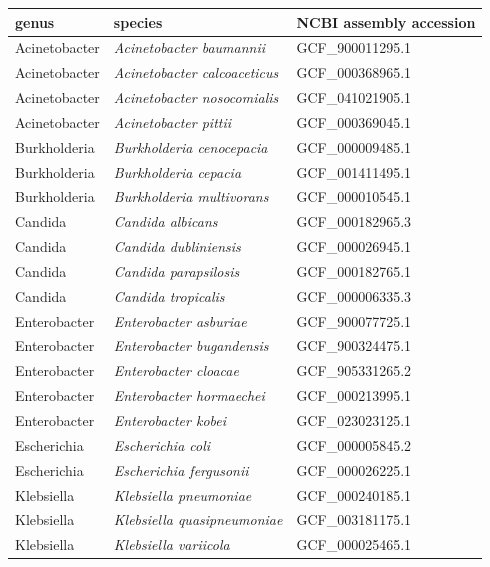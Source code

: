 \begin{tabular}{@{}lll@{}}
\toprule
\textbf{genus} & \textbf{species} & \textbf{NCBI assembly accession} \\
\midrule
Acinetobacter & \textit{Acinetobacter baumannii} & GCF\_900011295.1 \\
Acinetobacter & \textit{Acinetobacter calcoaceticus} & GCF\_000368965.1 \\
Acinetobacter & \textit{Acinetobacter nosocomialis} & GCF\_041021905.1 \\
Acinetobacter & \textit{Acinetobacter pittii} & GCF\_000369045.1 \\
Burkholderia & \textit{Burkholderia cenocepacia} & GCF\_000009485.1 \\
Burkholderia & \textit{Burkholderia cepacia} & GCF\_001411495.1 \\
Burkholderia & \textit{Burkholderia multivorans} & GCF\_000010545.1 \\
Candida & \textit{Candida albicans} & GCF\_000182965.3 \\
Candida & \textit{Candida dubliniensis} & GCF\_000026945.1 \\
Candida & \textit{Candida parapsilosis} & GCF\_000182765.1 \\
Candida & \textit{Candida tropicalis} & GCF\_000006335.3 \\
Enterobacter & \textit{Enterobacter asburiae} & GCF\_900077725.1 \\
Enterobacter & \textit{Enterobacter bugandensis} & GCF\_900324475.1 \\
Enterobacter & \textit{Enterobacter cloacae} & GCF\_905331265.2 \\
Enterobacter & \textit{Enterobacter hormaechei} & GCF\_000213995.1 \\
Enterobacter & \textit{Enterobacter kobei} & GCF\_023023125.1 \\
Escherichia & \textit{Escherichia coli} & GCF\_000005845.2 \\
Escherichia & \textit{Escherichia fergusonii} & GCF\_000026225.1 \\
Klebsiella & \textit{Klebsiella pneumoniae} & GCF\_000240185.1 \\
Klebsiella & \textit{Klebsiella quasipneumoniae} & GCF\_003181175.1 \\
Klebsiella & \textit{Klebsiella variicola} & GCF\_000025465.1 \\
\bottomrule
\end{tabular}
